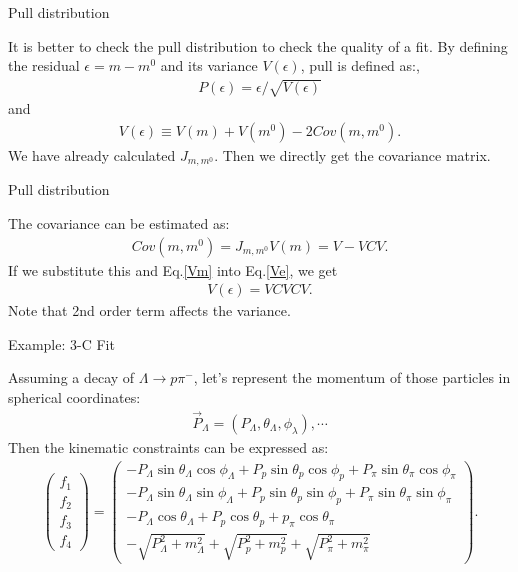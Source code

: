 \documentclass[
	xcolor=dvipsnames,
	10pt, 
	]{beamer}
\begin{document}
\begin{frame}{Pull distribution}
	\begin{block}{}
		It is better to check the pull distribution to check the quality of a fit. By defining the residual $\epsilon = m-m^0$ and its variance $V(\epsilon)$, pull is defined as:, 
		\begin{align}
			P(\epsilon) = \epsilon/\sqrt{V(\epsilon)}
		\end{align}
		and
		\begin{align}
			V(\epsilon) \equiv V(m)+ V(m^0) - 2 Cov(m,m^0).\label{Ve}
		\end{align}
		We have already calculated $J_{m,m^0}$. Then we directly get the covariance matrix. 
	\end{block}
\end{frame} 
\begin{frame}{Pull distribution}
	\begin{block}{}
		The covariance can be estimated as:
		\begin{align}
			Cov(m,m^0) = J_{m,m^0}V(m) = V - VCV.
		\end{align}
		If we substitute this and Eq.\eqref{Vm} into Eq.\eqref{Ve}, we get
		\begin{align}
			V(\epsilon) = VCVCV.
		\end{align}
		Note that 2nd order term affects the variance.	
	\end{block}
\end{frame}
\begin{frame}{Example: 3-C Fit }
	\begin{block}{}
		Assuming a decay of $\Lambda\to p\pi^-$, let's represent the momentum of those particles in spherical coordinates:
		\begin{align}
			\vec{P}_\Lambda = (P_\Lambda,\theta_\Lambda,\phi_\lambda),\cdots
		\end{align}
		Then the kinematic constraints can be expressed as:
		\begin{align}
			\begin{pmatrix}
				f_1\\f_2\\f_3\\f_4
			\end{pmatrix}=
			\begin{pmatrix}
			-P_\Lambda\sin\theta_\Lambda\cos\phi_\Lambda+P_p\sin\theta_p\cos\phi_p+P_\pi\sin\theta_\pi\cos\phi_\pi\\
			-P_\Lambda\sin\theta_\Lambda\sin\phi_\Lambda+P_p\sin\theta_p\sin\phi_p+P_\pi\sin\theta_\pi\sin\phi_\pi\\
			-P_\Lambda\cos\theta_\Lambda+P_p\cos\theta_p+p_\pi\cos\theta_\pi\\
			-\sqrt{P_\Lambda^2+m_\Lambda^2}+\sqrt{P_p^2+m_p^2}+\sqrt{P_\pi^2+m_\pi^2}
			\end{pmatrix}.\label{FMat}
		\end{align}
	\end{block}
\end{frame}
\end{document}
